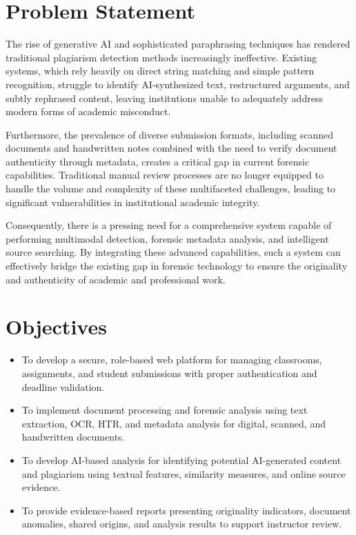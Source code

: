 \documentclass[12pt, a4paper]{report}
\numberwithin{equation}{chapter}
\begin{document}
\section{Problem Statement}
The rise of generative AI and sophisticated paraphrasing techniques has rendered traditional plagiarism detection methods increasingly ineffective. Existing systems, which rely heavily on direct string matching and simple pattern recognition, struggle to identify AI-synthesized text, restructured arguments, and subtly rephrased content, leaving institutions unable to adequately address modern forms of academic misconduct.

Furthermore, the prevalence of diverse submission formats, including scanned documents and handwritten notes combined with the need to verify document authenticity through metadata, creates a critical gap in current forensic capabilities.
 Traditional manual review processes are no longer equipped to handle the volume and complexity of these multifaceted challenges, leading to significant vulnerabilities in institutional academic integrity.

Consequently, there is a pressing need for a comprehensive system capable of performing multimodal detection, forensic metadata analysis, and intelligent source searching. By integrating these advanced capabilities, such a system can effectively bridge the existing gap in forensic technology to ensure the originality and authenticity of academic and professional work.
\section{Objectives}

\begin{itemize}
\item To develop a secure, role-based web platform for managing classrooms, assignments, and student submissions with proper authentication and deadline validation.

\item To implement document processing and forensic analysis using text extraction, OCR, HTR, and metadata analysis for digital, scanned, and handwritten documents.

\item To develop AI-based analysis for identifying potential AI-generated content and plagiarism using textual features, similarity measures, and online source evidence.

\item To provide evidence-based reports presenting originality indicators, document anomalies, shared origins, and analysis results to support instructor review.
\end{itemize}
\end{document}
